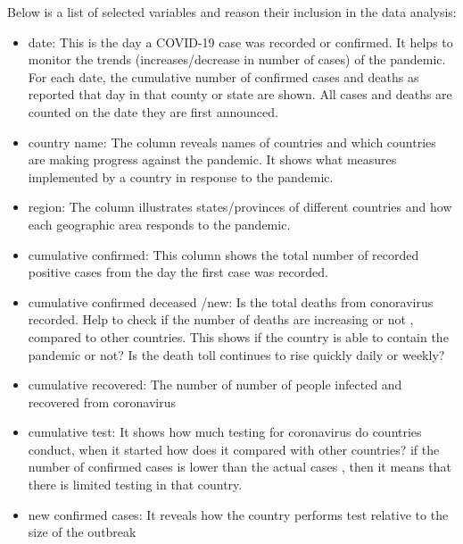 \documentclass[12pt,letterpaper, twoside]{article}
\begin{document}
Below is a list of selected variables and reason their inclusion in the data analysis:

\begin{itemize}
    \item date: This is the day a COVID-19 case was recorded or confirmed. It helps to monitor the trends (increases/decrease in number of cases) of the pandemic.
    For each date, the cumulative number of confirmed cases and deaths as reported that day in that county or state are shown. All cases and deaths are counted on the date they are first announced.
    
    \item country name: The column reveals names of countries and which countries are making progress against the pandemic. It shows what measures implemented by a country in response to the pandemic.
    
    \item region:  The column illustrates states/provinces of different countries and how each geographic area responds to the pandemic.
    
    \item cumulative confirmed: This column shows the total number of recorded positive cases from the day the first case was recorded. 
      
    \item cumulative confirmed deceased /new:  Is the total deaths from conoravirus recorded. Help to check if the number of deaths are increasing or not , compared to other countries. This shows if the country is able to contain the pandemic or not? Is the death toll continues to rise quickly daily or weekly?
    
    \item cumulative recovered: The number of number of people infected and recovered from coronavirus
      
     \item cumulative test:  It shows how much testing for coronavirus do countries conduct, when it started how does it compared with other countries? if the number of confirmed cases is lower than the actual cases , then it means that there is limited testing in that country.
      
    \item new confirmed cases:  It reveals how the country performs test relative to the size of the outbreak
    
\end{itemize}
\end{document}
